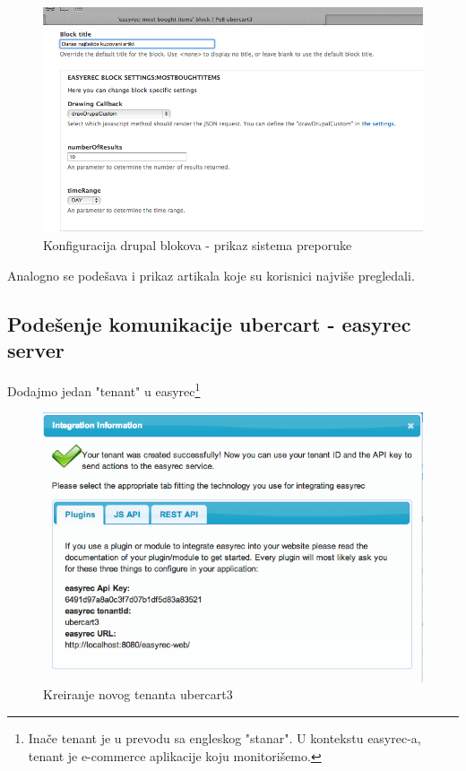 \documentclass[times, utf8, seminar]{fit}
\begin{document}
{{{\begin{figure}[H]
\centering
\includegraphics[width=12cm]{img/easyrec_ubercart_blocks_config_2.png}
\caption{Konfiguracija drupal blokova - prikaz sistema preporuke}
\end{figure}

Analogno se podešava i prikaz artikala koje su korisnici najviše pregledali.

\subsection{Podešenje komunikacije ubercart - easyrec server}

Dodajmo jedan "tenant" u easyrec\footnote{Inače tenant je u prevodu sa engleskog "stanar". U kontekstu easyrec-a, tenant je e-commerce aplikacije koju monitorišemo.}

\begin{figure}[H]
\centering
\includegraphics[width=12cm]{img/integ_easyrec.png}
\caption{Kreiranje novog tenanta ubercart3}
\end{figure}

}}}
\end{document}
